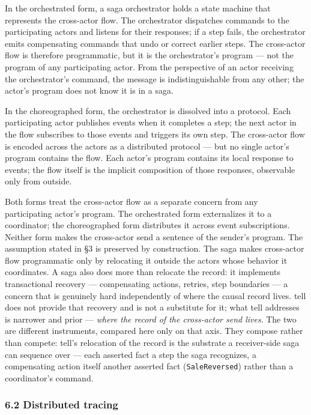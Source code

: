 \documentclass[
]{article}
\let\origtexttt\texttt%
\renewcommand{\texttt}[1]{\origtexttt{\seqsplit{#1}}}%
\let\texttt\origtexttt%
\begin{document}
In the orchestrated form, a saga orchestrator holds a state machine that
represents the cross-actor flow. The orchestrator dispatches commands to
the participating actors and listens for their responses; if a step
fails, the orchestrator emits compensating commands that undo or correct
earlier steps. The cross-actor flow is therefore programmatic, but it is
the orchestrator's program --- not the program of any participating
actor. From the perspective of an actor receiving the orchestrator's
command, the message is indistinguishable from any other; the actor's
program does not know it is in a saga.

In the choreographed form, the orchestrator is dissolved into a
protocol. Each participating actor publishes events when it completes a
step; the next actor in the flow subscribes to those events and triggers
its own step. The cross-actor flow is encoded across the actors as a
distributed protocol --- but no single actor's program contains the
flow. Each actor's program contains its local response to events; the
flow itself is the implicit composition of those responses, observable
only from outside.

Both forms treat the cross-actor flow as a separate concern from any
participating actor's program. The orchestrated form externalizes it to
a coordinator; the choreographed form distributes it across event
subscriptions. Neither form makes the cross-actor send a sentence of the
sender's program. The assumption stated in §3 is preserved by
construction. The saga makes cross-actor flow programmatic only by
relocating it outside the actors whose behavior it coordinates. A saga
also does more than relocate the record: it implements transactional
recovery --- compensating actions, retries, step boundaries --- a
concern that is genuinely hard independently of where the causal record
lives. tell does not provide that recovery and is not a substitute for
it; what tell addresses is narrower and prior --- \emph{where the record
of the cross-actor send lives}. The two are different instruments,
compared here only on that axis. They compose rather than compete:
tell's relocation of the record is the substrate a receiver-side saga
can sequence over --- each asserted fact a step the saga recognizes, a
compensating action itself another asserted fact (\texttt{SaleReversed})
rather than a coordinator's command.

\subsubsection{6.2 Distributed tracing}\label{distributed-tracing}
\end{document}
